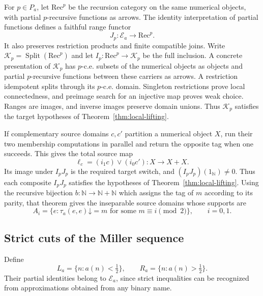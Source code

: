\documentclass[11pt]{article}
\newcommand{\N}{\mathbb N}
\begin{document}
For $p\in P_a$, let $\mathrm{Rec}^{p}$ be the recursion category on
the same numerical objects, with partial $p$-recursive functions as
arrows. The identity interpretation of partial functions defines a
faithful range functor
\[
 J_p:\mathcal E_a\longrightarrow\mathrm{Rec}^{p}.
\]
It also preserves restriction products and finite compatible joins.
Write $\mathcal K_p=\operatorname{Split}(\mathrm{Rec}^{p})$ and let
$I_p:\mathrm{Rec}^{p}\to\mathcal K_p$ be the full inclusion.
A concrete presentation of $\mathcal K_p$ has $p$-c.e. subsets of the
numerical objects as objects and partial $p$-recursive functions between
these carriers as arrows. A restriction idempotent splits through its $p$-c.e. domain.
Singleton restrictions prove local connectedness, and preimage search
for an injective map proves weak choice. Ranges are images, and inverse
images preserve domain unions. Thus $\mathcal K_p$ satisfies the target
hypotheses of Theorem~\ref{thm:local-lifting}.

If complementary source domains $c,c'$ partition a numerical object
$X$, run their two membership computations in parallel and return the
opposite tag when one succeeds. This gives the total source map
\[
 \ell_c=(i_1c)\vee(i_0c'):X\longrightarrow X+X.
\]
Its image under $I_pJ_p$ is the required target switch, and
$(I_pJ_p)(1_{\N})\ne0$. Thus each composite
$I_pJ_p$ satisfies the hypotheses of Theorem~\ref{thm:local-lifting}.
Using the recursive bijection $b:\N\to\N+\N$ which assigns the tag
of $m$ according to its parity, that theorem gives the inseparable
source domains whose supports are
\begin{equation}\label{eq:miller-diagonal-pair}
 A_i=\{e:\tau_a(e,e)\mathord\downarrow=m
                   \text{ for some }m\equiv i\pmod2\},
 \qquad i=0,1.
\end{equation}

\subsection{Strict cuts of the Miller sequence}
\label{sec:miller-cuts}

Define
\[
 L_a=\{n:a(n)<\tfrac12\},\qquad
 R_a=\{n:a(n)>\tfrac12\}.
\]
Their partial identities belong to $\mathcal E_a$, since strict
inequalities can be recognized from approximations obtained from any
binary name.
\end{document}
